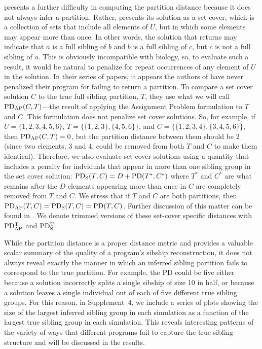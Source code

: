 \kinalyzer{} presents a further difficulty in computing the partition distance because it does not always 
infer a partition.  Rather, \kinalyzer{} presents its solution as a set cover, which is a collection of 
sets that include all elements of $U$, but in which some elements may appear more than once.  In other 
words, the solution that \kinalyzer{} returns may indicate that $a$ is a full sibling of $b$ and $b$ is a 
full sibling of $c$, but $c$ is not a full sibling of $a$.  This is obviously incompatible with
biology, so, to evaluate such a result, it would be natural to penalize for repeat 
occurrences of any element of $U$ in the solution.  In their series of papers, it appears 
the authors of \kinalyzer{} have never penalized their program for failing to return a partition.  To 
compare a set cover solution $C$ to the true full sibling partition, $T$, they use what we will call $
\mathrm{PD_{AP}}(C,T)$---the result of applying the Assignment Problem formulation to $T$ and $C$.     This 
formulation does not penalize set cover solutions.  So, for example, if  $U=\{1,2,3,4,5,6\}$,
$T=\{\{1,2,3\},\{4,5,6\}\}$, and $C=\{\{1,2,3,4\}, \{3,4,5,6\}\}$, then $\mathrm{PD_{AP}}(C,T)=0$, but the partition 
distance between them should be 2 (since two elements, 3 and 4, could be removed from both $T$ and $C$ 
to make them identical).    Therefore, we also evaluate set cover solutions using a quantity that 
includes a penalty for indviduals that appear in more than one sibling group in the set cover solution: 
$\mathrm{PD_S}(T,C)= D+\mathrm{PD}(T^*,C^*)$ where $T^*$ and $C^*$ are what remains after the $D$ elements appearing 
more than once in $C$ are completely removed from $T$ and $C$.  We stress that if $T$ and $C$ are both 
partitions, then $\mathrm{PD_{AP}}(T,C) = \mathrm{PD_S}(T,C)=\mathrm{PD}(T,C)$. 
Further discussion of this matter can be found in \citet{almudevar11}. 
We denote trimmed versions of these set-cover specific distances with $\mathrm{PD_{AP}^T}$ and $\mathrm{PD_S^T}$.

While the partition distance is a proper distance metric and provides a valuable scalar summary of the 
quality of a program's sibship reconstruction, it does not always reveal exactly the manner in which an 
inferred sibling  partition fails to correspond to the true partition.  For example, the PD could be 
five either because a solution incorrectly splits a single sibship of size 10 in half, or because a 
solution leaves a single individual out of each of five different true sibling groups.  For this 
reason, in Supplement~4, we include a series of plots showing the size of the largest inferred sibling 
group in each simulation as a function of the largest true sibling group in each simulation.  This 
reveals interesting patterns of the variety of ways that different programs fail to capture the true 
sibling structure and will be discussed in the results.

